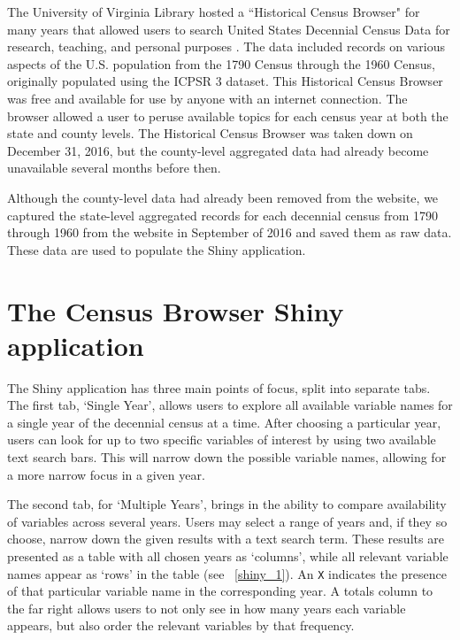 \documentclass[DIV=calc, paper=a4, fontsize=10pt, twocolumn]{scrartcl}\usepackage[]{graphicx}\usepackage[]{color}
\begin{document}
\par The University of Virginia Library hosted a ``Historical Census Browser" for many years that allowed users to search United States Decennial Census Data for research, teaching, and personal purposes \citep{HCB}. The data included records on various aspects of the U.S. population from the 1790 Census through the 1960 Census, originally populated using the ICPSR 3 dataset. This Historical Census Browser was free and available for use by anyone with an internet connection. The browser allowed a user to peruse available topics for each census year at both the state and county levels. The Historical Census Browser was taken down on December 31, 2016, but the county-level aggregated data had already become unavailable several months before then.  

\par Although the county-level data had already been removed from the website, we captured the state-level aggregated records for each decennial census from 1790 through 1960 from the website in September of 2016 and saved them as raw data. These data are used to populate the Shiny application.  


\section*{The Census Browser Shiny application}  

\par The Shiny application has three main points of focus, split into separate tabs. The first tab, `Single Year', allows users to explore all available variable names for a single year of the decennial census at a time. After choosing a particular year, users can look for up to two specific variables of interest by using two available text search bars. This will narrow down the possible variable names, allowing for a more narrow focus in a given year.  

\par The second tab, for `Multiple Years', brings in the ability to compare availability of variables across several years. Users may select a range of years and, if they so choose, narrow down the given results with a text search term. These results are presented as a table with all chosen years as `columns', while all relevant variable names appear as `rows' in the table (see ~\autoref{shiny_1}). An \texttt{X} indicates the presence of that particular variable name in the corresponding year. A totals column to the far right allows users to not only see in how many years each variable appears, but also order the relevant variables by that frequency.  
\end{document}
